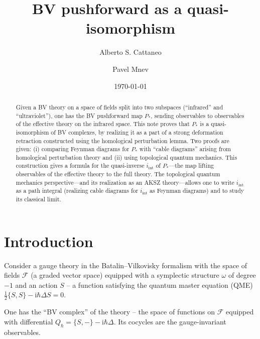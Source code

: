 \documentclass{amsart}
\title{BV pushforward as a quasi-isomorphism}
\author[A. S. Cattaneo]{Alberto S. Cattaneo}
\author[P. Mnev]{Pavel Mnev}
\date{\today}
\theoremstyle{plain} %
\theoremstyle{definition}
\theoremstyle{remark}
\newcommand{\F}{\mathcal{F}}
\newcommand{\ii}{\mathrm{int}}
\newcommand{\iii}{\mathrm{i}}
\begin{document}
\begin{abstract}
    Given a BV theory on a space of fields split into two subspaces (``infrared'' and ``ultraviolet''), one has the BV pushforward map $P_*$, sending observables to observables of the effective theory on the infrared space. This note proves that $P_*$ is a quasi-isomorphism of BV complexes, by realizing it as a part of a strong deformation retraction constructed using the homological perturbation lemma. Two proofs are given: (i) comparing Feynman diagrams for $P_*$ with ``cable diagrams'' arising from homological perturbation theory and (ii) using topological quantum mechanics. This construction gives a formula for the quasi-inverse $i_\ii$ of $P_*$---the map lifting observables of the effective theory to the full theory. The topological quantum mechanics perspective---and its realization as an AKSZ theory---allows one to write $i_\ii$ as a path integral (realizing cable diagrams for $i_\ii$ as Feynman diagrams) and to study its classical limit.
\end{abstract}

\maketitle

\setcounter{tocdepth}{3}
\tableofcontents


\section{Introduction}
Consider a gauge theory in the Batalin--Vilkovisky formalism with the space of fields $\F$ (a graded vector space) equipped with a symplectic structure $\omega$ of degree $-1$ and an action $S$ -- a function satisfying the quantum master equation (QME) ${\frac12 \{S,S\}-\iii\hbar\Delta S=0}$. 

One has the ``BV complex'' of the theory -- the space of functions on $\F$ equipped with differential $Q_\hbar=\{S,-\}-\iii\hbar\Delta$. Its cocycles are the gauge-invariant observables.
\end{document}

